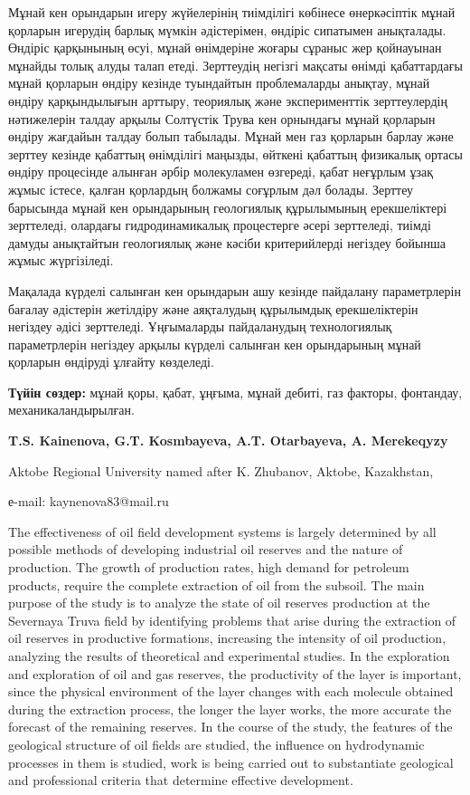 Мұнай кен орындарын игеру жүйелерінің тиімділігі көбінесе өнеркәсіптік
мұнай қорларын игерудің барлық мүмкін әдістерімен, өндіріс сипатымен
анықталады. Өндіріс қарқынының өсуі, мұнай өнімдеріне жоғары сұраныс жер
қойнауынан мұнайды толық алуды талап етеді. Зерттеудің негізгі мақсаты
өнімді қабаттардағы мұнай қорларын өндіру кезінде туындайтын
проблемаларды анықтау, мұнай өндіру қарқындылығын арттыру, теориялық
және эксперименттік зерттеулердің нәтижелерін талдау арқылы Солтүстік
Трува кен орнындағы мұнай қорларын өндіру жағдайын талдау болып
табылады. Мұнай мен газ қорларын барлау және зерттеу кезінде қабаттың
өнімділігі маңызды, өйткені қабаттың физикалық ортасы өндіру процесінде
алынған әрбір молекуламен өзгереді, қабат неғұрлым ұзақ жұмыс істесе,
қалған қорлардың болжамы соғұрлым дәл болады. Зерттеу барысында мұнай
кен орындарының геологиялық құрылымының ерекшеліктері зерттеледі,
олардағы гидродинамикалық процестерге әсері зерттеледі, тиімді дамуды
анықтайтын геологиялық және кәсіби критерийлерді негіздеу бойынша жұмыс
жүргізіледі.

Мақалада күрделі салынған кен орындарын ашу кезінде пайдалану
параметрлерін бағалау әдістерін жетілдіру және аяқталудың құрылымдық
ерекшеліктерін негіздеу әдісі зерттеледі. Ұңғымаларды пайдаланудың
технологиялық параметрлерін негіздеу арқылы күрделі салынған кен
орындарының мұнай қорларын өндіруді ұлғайту көзделеді.

{\bfseries Түйін сөздер:} мұнай қоры, қабат, ұңғыма, мұнай дебиті, газ факторы,
фонтандау, механикаландырылған.


\begin{center}
{\bfseries T.S. Kainenova\envelope, G.T. Kosmbayeva, A.T.
Otarbayeva, A. Merekeqyzy}

Aktobe Regional University named after K. Zhubanov, Aktobe, Kazakhstan,

е-mail: kaynenova83@mail.ru
\end{center}

The effectiveness of oil field development systems is largely determined
by all possible methods of developing industrial oil reserves and the
nature of production. The growth of production rates, high demand for
petroleum products, require the complete extraction of oil from the
subsoil. The main purpose of the study is to analyze the state of oil
reserves production at the Severnaya Truva field by identifying problems
that arise during the extraction of oil reserves in productive
formations, increasing the intensity of oil production, analyzing the
results of theoretical and experimental studies. In the exploration and
exploration of oil and gas reserves, the productivity of the layer is
important, since the physical environment of the layer changes with each
molecule obtained during the extraction process, the longer the layer
works, the more accurate the forecast of the remaining reserves. In the
course of the study, the features of the geological structure of oil
fields are studied, the influence on hydrodynamic processes in them is
studied, work is being carried out to substantiate geological and
professional criteria that determine effective development.


